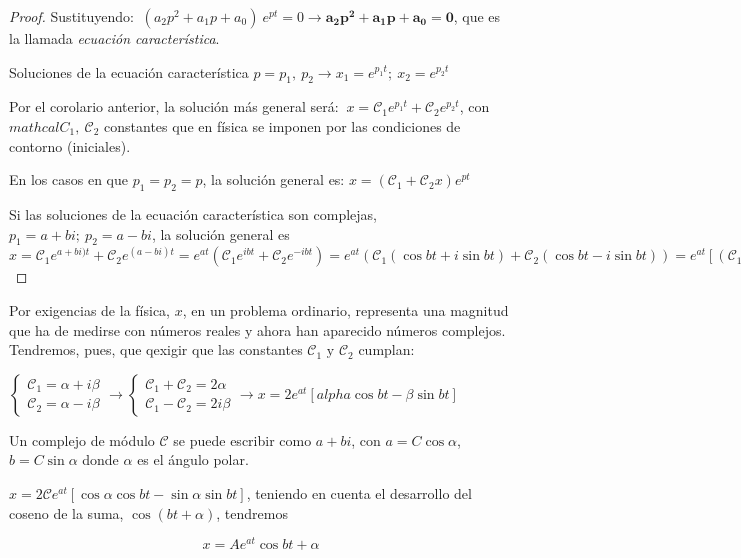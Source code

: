 {\begin{proof}
 Sustituyendo: $\ (a_2 p^2+a_1p+a_0) \ e^{pt}= 0 \to \boldsymbol{a_2 p^2+a_1p+a_0=0}$, que es la llamada \emph{ecuación característica}.
 
 Soluciones de la ecuación característica $p=p_1,\ p_2 \to x_1=e^{p_1t}; \ x_2=e^{p_2t}$
 
 Por el corolario anterior, la solución más general será: $\ x=\mathcal C_1 e^{p_1t}+\mathcal C_2 e^{p_2t}$, con $mathcal C_1, \ \mathcal C_2$ constantes que en física se imponen por las condiciones de contorno (iniciales).
 
 En los casos en que $p_1=p_2=p$, la solución general es: $x=(\mathcal C_1+  \mathcal C_2 x) e^{pt}$
 
 Si las soluciones de la ecuación característica son complejas, $p_1=a+ b i; \ p_2=a-bi$, la solución general es $x=\mathcal C_1 e^{a+bi)t} + \mathcal C_2 e^{(a-bi)t}=e^{at} \left( \mathcal C_1 e^{ibt} + \mathcal C_2 e^{-ibt} \right) = e^{at} \left( \mathcal C_1 \left( \cos bt + i \sin bt \right) + \mathcal C_2 \left( \cos bt-i \sin bt \right) \right) = e^{at} \left[ \left( \mathcal C_1+\mathcal C_2 \right) \cos bt + i \left( \mathcal C_1-\mathcal C_2 \right) \sin bt \right]$
\end{proof}

Por exigencias de la física, $x$, en un problema ordinario, representa una magnitud que ha de medirse con números reales y ahora han aparecido números complejos. Tendremos, pues, que qexigir que las constantes $\mathcal C_1 \text{ y } \mathcal C_2$ cumplan:

$\begin{cases}
 \mathcal C_1=\alpha + i \beta \\  \mathcal C_2	=\alpha - i \beta
\end{cases} \to
\begin{cases}
 \mathcal C_1 + \mathcal C_2 = 2\alpha \\ \mathcal C_1 - \mathcal C_2 =2i\beta
 \end{cases} \to x=2e^{at}\left[ alpha \cos bt - \beta \sin bt \right]$
 
 Un complejo de módulo $ \mathcal C $ se puede escribir como $a+bi$, con $a=C\cos \alpha$, $b=C \sin \alpha$ donde $\alpha$ es el ángulo polar. 
 
$x=2\mathcal C e^{at} \left[ \cos \alpha \cos bt - \sin \alpha \sin bt \right]$, teniendo en cuenta el desarrollo del coseno de la suma, $\cos(bt+\alpha)$, tendremos
 
$$x=A e^{at}\cos{bt+\alpha}$$

}
